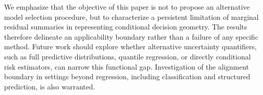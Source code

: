 \documentclass[pdflatex,sn-mathphys-ay]{sn-jnl}%
\theoremstyle{thmstyleone}%
\theoremstyle{thmstyletwo}%
\theoremstyle{thmstylethree}%
\begin{document}
We emphasize that the objective of this paper is not to propose an alternative model selection procedure, but to characterize a persistent limitation of marginal residual summaries in representing conditional decision geometry. The results therefore delineate an applicability boundary rather than a failure of any specific method. Future work should explore whether alternative uncertainty quantifiers, such as full predictive distributions, quantile regression, or directly conditional risk estimators, can narrow this functional gap. Investigation of the alignment boundary in settings beyond regression, including classification and structured prediction, is also warranted.


\end{document}
